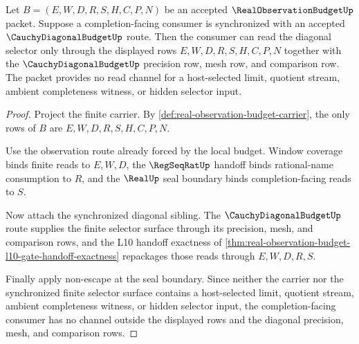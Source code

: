 \begin{theorem}
\label{thm:real-observation-budget-diagonal-selector-source-lock}
Let $B=(E,W,D,R,S,H,C,P,N)$ be an accepted $\RealObservationBudgetUp$ packet. Suppose a completion-facing consumer is synchronized with an accepted $\CauchyDiagonalBudgetUp$ route. Then the consumer can read the diagonal selector only through the displayed rows $E,W,D,R,S,H,C,P,N$ together with the $\CauchyDiagonalBudgetUp$ precision row, mesh row, and comparison row. The packet provides no read channel for a host-selected limit, quotient stream, ambient completeness witness, or hidden selector input.
\end{theorem}
\begin{proof}
Project the finite carrier. By \autoref{def:real-observation-budget-carrier}, the only rows of $B$ are $E,W,D,R,S,H,C,P,N$.

Use the observation route already forced by the local budget. Window coverage binds finite reads to $E,W,D$, the $\RegSeqRatUp$ handoff binds rational-name consumption to $R$, and the $\RealUp$ seal boundary binds completion-facing reads to $S$.

Now attach the synchronized diagonal sibling. The $\CauchyDiagonalBudgetUp$ route supplies the finite selector surface through its precision, mesh, and comparison rows, and the L10 handoff exactness of \autoref{thm:real-observation-budget-l10-gate-handoff-exactness} repackages those reads through $E,W,D,R,S$.

Finally apply non-escape at the seal boundary. Since neither the carrier nor the synchronized finite selector surface contains a host-selected limit, quotient stream, ambient completeness witness, or hidden selector input, the completion-facing consumer has no channel outside the displayed rows and the diagonal precision, mesh, and comparison rows.
\end{proof}

